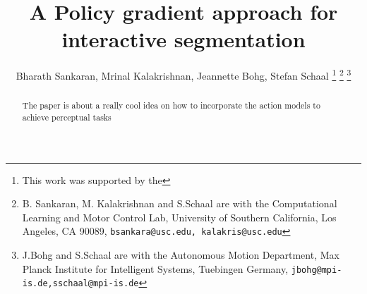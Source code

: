 \documentclass[letterpaper, 10pt, conference]{ieeeconf}
\begin{document}
\title{\LARGE \bf A Policy gradient approach for interactive segmentation}

\author{Bharath Sankaran, Mrinal Kalakrishnan, Jeannette Bohg, Stefan Schaal%
\thanks{This work was supported by the }%
\thanks{B. Sankaran, M. Kalakrishnan and S.Schaal are with the Computational Learning and Motor Control Lab, University of Southern California, Los Angeles, CA 90089, {\tt\small bsankara@usc.edu, kalakris@usc.edu}}%
\thanks{J.Bohg and S.Schaal are with the Autonomous Motion Department, Max Planck Institute for Intelligent Systems, Tuebingen Germany, {\tt\small jbohg@mpi-is.de,sschaal@mpi-is.de}}%
}
\maketitle


\begin{abstract}
The paper is about a really cool idea on how to incorporate the action models to achieve perceptual tasks
\end{abstract}







%


\end{document}
